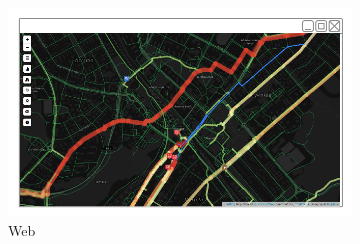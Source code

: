 \begin{figure}[ht]
  \centering
  \begin{subfigure}[b]{0.6\textwidth}
    \includegraphics[width=\textwidth]
      {img/c03-merge/png/web-basemap-merge.png}
    \caption{Web}
  \end{subfigure}
  ~
  \begin{subfigure}[b]{0.2\textwidth}

\end{subfigure}
\end{figure}
